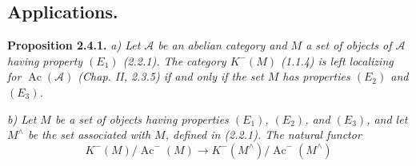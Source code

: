\setcounter{subsection}{3}%
\subsection{Applications.}

\noindent\textbf{Proposition 2.4.1.}\quad
\textit{a) Let $\mathcal A$ be an abelian category and $M$ a set of
objects of $\mathcal A$ having property $(E_1)$ (2.2.1). The category
$K^{-}(M)$ (1.1.4) is left localizing for
$\operatorname{Ac}(\mathcal A)$ (Chap. II, 2.3.5) if and only if the set
$M$ has properties $(E_2)$ and $(E_3)$.}

\noindent\textit{b) Let $M$ be a set of objects having properties
$(E_1)$, $(E_2)$, and $(E_3)$, and let $M^{\wedge}$ be the set associated
with $M$, defined in (2.2.1). The natural functor}
\[
K^{-}(M)/\operatorname{Ac}^{-}(M)
\longrightarrow
K^{-}(M^{\wedge})/\operatorname{Ac}^{-}(M^{\wedge})
\]
\endgroup
